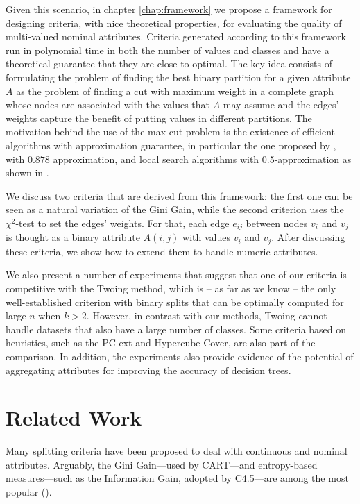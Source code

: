 Given this scenario,  in chapter \ref{chap:framework} we propose
a framework for designing criteria, with nice theoretical properties, for evaluating the quality of 
 multi-valued nominal attributes.
Criteria generated according to this framework
run in polynomial time in both the number of values and classes and
have a theoretical guarantee that they are close to optimal.
The key idea consists of formulating the problem
of finding the best binary partition for a given attribute $A$ as the  problem of finding a 
cut with maximum weight  in a complete graph whose nodes are associated with the values that $A$ may assume and the edges' weights capture the benefit of putting
values in different partitions. The  motivation behind the use of the max-cut problem is 
the existence of efficient algorithms with 
approximation guarantee, in particular 
the one proposed  by \cite{GoeWil95}, with $0.878$ approximation,
and  local search  algorithms with 0.5-approximation as shown in \cite{journals/corr/AngelBPW16}.


We discuss two criteria that are derived from this framework:
the first one  can be seen as a natural variation of the
Gini Gain, while the second criterion uses the $\chi^2$-test  to set the edges' weights. For that, each
edge $e_{ij}$ between nodes  $v_i$ and $v_j$
is thought as a binary attribute $A(i,j)$ with values $v_i$ and $v_j$.
After discussing these criteria, we show how to extend them to handle
numeric attributes.

We also  present a number of experiments that suggest that one of our criteria is competitive with the Twoing method, which is -- as far as we know -- the only well-established criterion with binary splits that can be optimally computed for large $n$ when $k > 2$. However, in contrast with our methods, Twoing cannot handle datasets that also have a large number of classes. Some criteria based on heuristics, such as the PC-ext and Hypercube Cover, are also part of the comparison. In addition, the experiments also  provide evidence of the potential of aggregating  attributes for improving the accuracy of decision trees.

\section{Related Work}
\label{chap:relatedwork}

Many splitting criteria have been proposed to 
deal with continuous and nominal attributes.
Arguably, the Gini Gain---used by CART---and entropy-based measures---such as 
the Information Gain, adopted by C4.5---are among
the most popular (\cite{books/sp/datamining2005/RokachM05,
Loh2014,series/sbcs/BarrosCF15}).

